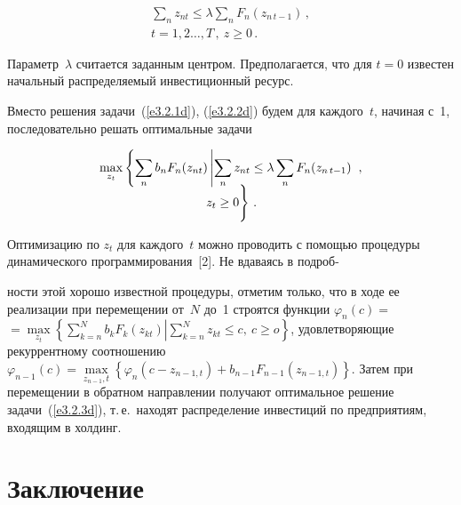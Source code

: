 \begin{multicols}{2}
\vspace*{-6pt}

\noindent
\begin{multline}
\sum\limits_n z_{nt}\leq \lambda \sum\limits_n F_n(z_{n\,t-1})\,,\\[-6pt]
 t=1,2\ldots 
, T\,, \ z\geq 0\,.
\label{e3.2.2d}
\end{multline}
     
     Параметр~$\lambda$ считается заданным центром. Предполагается, что 
для $t=0$ известен начальный распределяемый инвестиционный ресурс. 
     
     Вместо решения задачи~(\ref{e3.2.1d}), (\ref{e3.2.2d}) будем для 
каж\-до\-го~$t$, начиная с~1, последовательно решать оптимальные задачи 

\vspace*{-6pt}

\noindent
     \begin{multline}
     \underset{z_t}{\max}\left \{ \sum\limits_n b_n F_n(z_{nt})\left\vert 
\sum\limits_n z_{nt}\leq \lambda \sum\limits_n F_n(z_{n\,t-1})\right.\right.\,,\\[-6pt]
\left. \vphantom{\sum\limits_n} z_t\geq 0
\right \}
\,.
     \label{e3.2.3d}
     \end{multline}

Оптимизацию по $z_t$ для каждого~$t$ можно проводить с помощью 
процедуры динамического программирования~[2]. Не вдаваясь в 
подроб-\linebreak\vspace*{-12pt}
\columnbreak

\noindent
ности этой хорошо известной процедуры, отметим только, что в ходе 
ее реализации при перемещении от~$N$ до~1 строятся функции 
$\varphi_n(c)=$\linebreak $=\underset{z_t}{\max} \left \{\sum\limits_{k=n}^N b_k 
F_k(z_{kt})\left\vert \sum\limits_{k=n}^N z_{kt}\right. \leq c,\ c\geq o\right \}$, 
удовле\-творяющие рекуррентному соотношению $\varphi_{n-
1}(c)\!=\!\underset{z_{n-1},t}{\max}\!\left\{\varphi_n(c-z_{n-1,t})+b_{n-1}F_{n-
1}(z_{n-1,t})\right \}$. Затем при перемещении в обратном направлении 
получают оптимальное решение задачи~(\ref{e3.2.3d}), т.\,е.\ находят 
распределение инвестиций по предприятиям, входящим в холдинг.

\vspace*{-9pt}

\section{Заключение}


\end{multicols}
